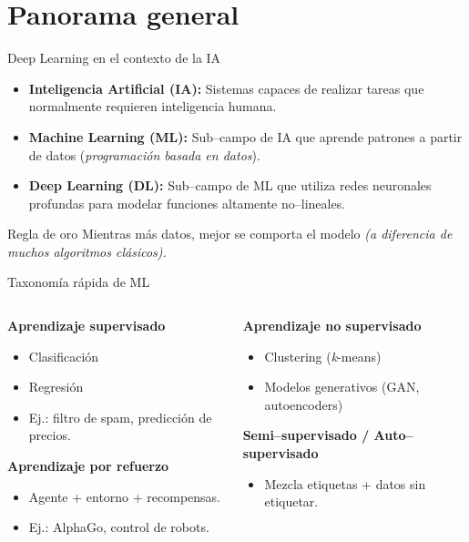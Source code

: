 \documentclass[8pt,spanish]{beamer}
\begin{document}
\section{Panorama general}
\begin{frame}{Deep Learning en el contexto de la IA}
  \begin{itemize}
    \item \textbf{Inteligencia Artificial (IA):} Sistemas capaces de realizar tareas que normalmente requieren inteligencia humana.
    \item \textbf{Machine Learning (ML):} Sub--campo de IA que aprende patrones a partir de datos (\emph{programación basada en datos}).
    \item \textbf{Deep Learning (DL):} Sub--campo de ML que utiliza redes neuronales profundas para modelar funciones altamente no--lineales.
  \end{itemize}
  \begin{block}{Regla de oro}
    Mientras más datos, mejor se comporta el modelo \emph{(a diferencia de muchos algoritmos clásicos).}
  \end{block}
\end{frame}

\begin{frame}{Taxonomía rápida de ML}
  \begin{columns}[T]
    \begin{column}{0.5\textwidth}
      \textbf{Aprendizaje supervisado}
      \begin{itemize}
        \item Clasificación
        \item Regresión
        \item Ej.: filtro de spam, predicción de precios.
      \end{itemize}
      \vspace{1em}
      \textbf{Aprendizaje por refuerzo}
      \begin{itemize}
        \item Agente + entorno + recompensas.
        \item Ej.: AlphaGo, control de robots.
      \end{itemize}
    \end{column}
    \begin{column}{0.5\textwidth}
      \textbf{Aprendizaje no supervisado}
      \begin{itemize}
        \item Clustering (\emph{k}-means)
        \item Modelos generativos (GAN, autoencoders)
      \end{itemize}
      \vspace{1em}
      \textbf{Semi--supervisado / Auto--supervisado}
      \begin{itemize}
        \item Mezcla etiquetas + datos sin etiquetar.
      \end{itemize}
    \end{column}
  \end{columns}
\end{frame}
\end{document}
